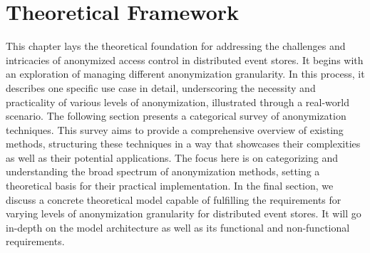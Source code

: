 \chapter{Theoretical Framework\label{cha:chapter3}}
This chapter lays the theoretical foundation for addressing the challenges and intricacies of anonymized access control in distributed event stores. It begins with an exploration of managing different anonymization granularity. In this process, it describes one specific use case in detail, underscoring the necessity and practicality of various levels of anonymization, illustrated through a real-world scenario. The following section presents a categorical survey of anonymization techniques. This survey aims to provide a comprehensive overview of existing methods, structuring these techniques in a way that showcases their complexities as well as their potential applications. The focus here is on categorizing and understanding the broad spectrum of anonymization methods, setting a theoretical basis for their practical implementation. In the final section, we discuss a concrete theoretical model capable of fulfilling the requirements for varying levels of anonymization granularity for distributed event stores. It will go in-depth on the model architecture as well as its functional and non-functional requirements. 

